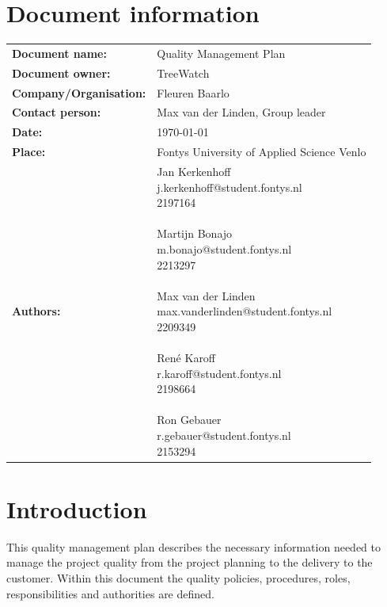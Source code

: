 \documentclass[12pt]{article}
\begin{document}
\section*{Document information}
\begin{tabular}{ll}
	\textbf{Document name:} & Quality Management Plan\\
	\textbf{Document owner:} & TreeWatch \\
	\textbf{Company/Organisation:} & Fleuren Baarlo \\
	\textbf{Contact person:} & Max van der Linden, Group leader \\
	\textbf{Date:} & \today \\
	\textbf{Place:} & Fontys University of Applied Science Venlo \\
	\textbf{Authors:} & \parbox[t]{5cm}{
		Jan Kerkenhoff\\ j.kerkenhoff@student.fontys.nl\\ 2197164 \\ \\
		Martijn Bonajo\\ m.bonajo@student.fontys.nl\\ 2213297 \\ \\
		Max van der Linden\\ max.vanderlinden@student.fontys.nl\\ 2209349 \\ \\
		René Karoff\\ r.karoff@student.fontys.nl\\ 2198664 \\ \\
		Ron Gebauer\\ r.gebauer@student.fontys.nl\\ 2153294 \\ }
\end{tabular}
\clearpage
\listoffigures
{}
\listoftables
{}
\pagebreak

\tableofcontents
\clearpage
{}
\section{Introduction}
This quality management plan describes the necessary information needed to manage the project quality from the project planning to the delivery to the customer. Within this document the quality policies, procedures, roles, responsibilities and authorities are defined.
\clearpage
\end{document}

